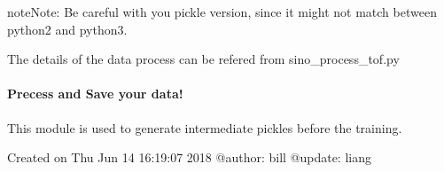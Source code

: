 \documentclass[letterpaper,10pt,english]{sphinxmanual}
\begin{document}
%
\begin{sphinxVerbatim}[commandchars=\\\{\}]
  
\end{sphinxVerbatim}

\begin{sphinxadmonition}{note}{Note:}
Be careful with you pickle version, since it might not match between python2 and python3.
\end{sphinxadmonition}

The details of the data process can be refered from sino\_process\_tof.py


\paragraph{Precess and Save your data!}
\label{\detokenize{usage/tof_file:module-sino_process_tof}}\label{\detokenize{usage/tof_file:precess-and-save-your-data}}\label{\detokenize{usage/tof_file::doc}}
This module is used to generate intermediate pickles before the training.

Created on Thu Jun 14 16:19:07 2018
@author: bill
@update: liang
\end{document}
